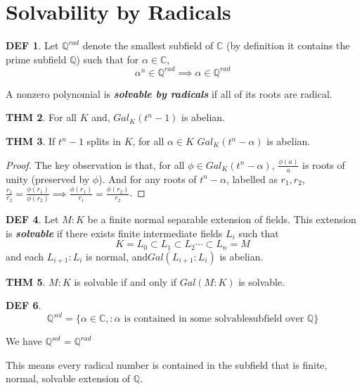 \documentclass[twocolumn]{article}
\renewcommand{\emph}[1]{\textbf{\textit{#1}}}
\newcommand{\Q}{\mathbb{Q}}
\newcommand{\C}{\mathbb{C}}
\theoremstyle{definition}
\newtheorem{thm}{THM}
\newtheorem{defi}[thm]{DEF}
\theoremstyle{remark}
\begin{document}
\section{Solvability by Radicals}

\begin{defi}
	Let $\Q^{rad}$ denote the smallest subfield of $\C$ (by definition it contains the prime subfield $\Q$) such that for $\alpha \in \C$, 
	$$
		\alpha^n \in \Q^{rad} \implies \alpha \in \Q^{rad}
	$$

	A nonzero polynomial is \emph{solvable by radicals} if all of its roots are radical.
\end{defi}

\begin{thm}
	For all $K$ and, $Gal_K(t^n - 1)$ is abelian.
\end{thm}

\begin{thm}
	If $t^n -1 $ splits in $K$, for all $\alpha \in K$ $Gal_{K}(t^n - \alpha)$ is abelian.
\end{thm}

\begin{proof}
	The key observation is that, for all $\phi \in Gal_{K}(t^n - \alpha)$, $\frac{\phi(a)}{a}$ is roots of unity (preserved by $\phi$).
	And for any roots of $t^n - \alpha$,  labelled as $r_1, r_2$, $\frac{r_1}{r_2} = \frac{\phi(r_1)}{\phi(r_2)} \implies \frac{\phi(r_1)}{r_1} = \frac{\phi(r_2)}{r_2}$.
\end{proof}

\begin{defi}
	Let $M:K$ be a finite normal separable extension of fields. 
	This extension is \emph{solvable} if there exists finite intermediate fields $L_i$ such that
	$$
	K = L_0 \subset L_1 \subset L_2 \cdots \subset L_n = M
	$$
	and each $L_{i+1}:L_i$ is normal, and$Gal(L_{i+1}:L_i)$ is abelian.
\end{defi}

\begin{thm}
	$M:K$ is solvable if and only if $Gal(M:K)$ is solvable.
\end{thm}

\begin{defi}
	$$\Q^{sol} = \{\alpha \in\C,: \alpha \text{ is contained in some solvablesubfield over } \Q \}$$

	We have $\Q^{sol} = \Q^{rad}$

	This means every radical number is contained in the subfield that is finite, normal, solvable extension of $\Q$.
\end{defi}
\end{document}
